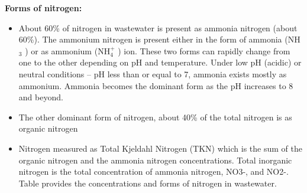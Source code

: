 	\textbf{Forms of nitrogen:}\\	
					      \begin{itemize}
					      	\item About 60\% of nitrogen in wastewater is present as ammonia nitrogen (about 60\%).  The ammonium nitrogen is present either in the form of ammonia (NH$_3$ ) or as ammonium (NH$_4^+$ ) ion.   These two forms can rapidly change from one to the other depending on pH and temperature.  Under low pH (acidic) or neutral conditions – pH less than or equal to 7, ammonia exists mostly as ammonium.  Ammonia becomes the dominant form as the pH increases to 8 and beyond.
					      	\item The other dominant form of nitrogen, about 40\% of the total nitrogen is as organic nitrogen
					      	\item Nitrogen measured as Total Kjeldahl Nitrogen (TKN) which is the sum of the organic nitrogen and the ammonia nitrogen concentrations.  Total inorganic nitrogen is the total concentration of ammonia nitrogen, NO3-, and NO2-.   Table provides the concentrations and forms of nitrogen in wastewater.
					      \end{itemize}
					      \setlength{\arrayrulewidth}{0.7mm}
					      \setlength{\tabcolsep}{8 pt}
					      \renewcommand{\arraystretch}{0.8}
